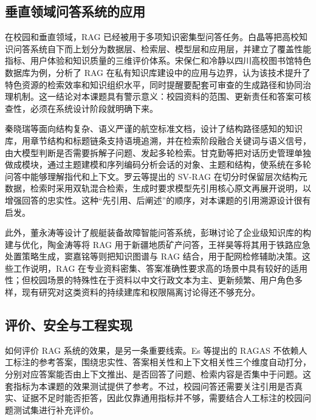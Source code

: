 \subsection{垂直领域问答系统的应用}

在校园和垂直领域，RAG 已经被用于多项知识密集型问答任务。白晶等把高校知识问答系统自下而上划分为数据层、检索层、模型层和应用层，并建立了覆盖性能指标、用户体验和知识质量的三维评价体系。宋保仁和冷静以四川高校图书馆特色数据库为例，分析了 RAG 在私有知识库建设中的应用与边界，认为该技术提升了特色资源的检索效率和知识组织水平，同时提醒要配套可审查的生成路径和协同治理机制。这一结论对本课题具有警示意义：校园资料的范围、更新责任和答案可核查性，必须在系统设计阶段就明确下来。

秦晓瑞等面向结构复杂、语义严谨的航空标准文档，设计了结构路径感知的知识库，用章节结构和标题链条支持语境追溯，并在检索阶段融合关键词与语义信号，由大模型判断是否需要拆解子问题、发起多轮检索。甘克勤等把对话历史管理单独做成模块，通过主题建模和序列编码分析会话的对象、主题和结构，使系统在多轮问答中能够理解指代和上下文。罗云等提出的 SV-RAG 在切分时保留层次结构元数据，检索时采用双轨混合检索，生成时要求模型先引用核心原文再展开说明，以增强回答的忠实性。这种“先引用、后阐述”的顺序，对本课题的引用溯源设计很有启发。

此外，董永涛等设计了舰艇装备故障智能问答系统，彭琳讨论了企业级知识库的构建与优化，陶金涛等将 RAG 用于新疆地质矿产问答，王祥昊等将其用于铁路应急处置策略生成，窦嘉铭等则把知识图谱与 RAG 结合，用于配网检修辅助决策。这些工作说明，RAG 在专业资料密集、答案准确性要求高的场景中具有较好的适用性；但校园场景的特殊性在于资料以中文行政文本为主、更新频繁、用户角色多样，现有研究对这类资料的持续建库和权限隔离讨论得还不够充分。

\subsection{评价、安全与工程实现}

如何评价 RAG 系统的效果，是另一条重要线索。Es 等提出的 RAGAS 不依赖人工标注的参考答案，围绕忠实性、答案相关性和上下文相关性三个维度自动打分，分别对应答案能否由上下文推出、是否回答了问题、检索内容是否集中于问题。这套指标为本课题的效果测试提供了参考。不过，校园问答还需要关注引用是否真实、证据不足时能否拒答，因此仅靠通用指标并不够，需要结合人工标注的校园问题测试集进行补充评价。

